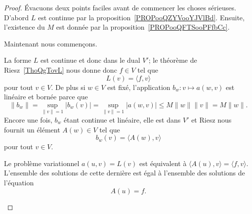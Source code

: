 \begin{proof}
	Évacuons deux points faciles avant de commencer les choses sérieuses. D'abord \( L\) est continue par la proposition~\ref{PROPooQZYVooYJVlBd}. Ensuite, l'existence du \( M\) est donnée par la proposition~\ref{PROPooQFTSooPFfbCc}.

	Maintenant nous commençons.

	\begin{subproof}
		La forme \( L\) est continue et donc dans le dual \( V'\); le théorème de Riesz~\ref{ThoQgTovL} nous donne donc \( f\in V\) tel que
		\begin{equation}
			L(v)=\langle f, v\rangle
		\end{equation}
		pour tout \( v\in V\). De plus si \( w\in V\) est fixé, l'application \( b_w\colon v\mapsto a(w,v)\) est linéaire et bornée parce que
		\begin{equation}
			\| b_w \|=\sup_{\| v \|=1}| b_w(v) |=\sup_{\| v \|=1}| a(w,v) |\leq M\| w \|\| v \|=M\| w \|.
		\end{equation}
		Encore une fois, \( b_w\) étant continue et linéaire, elle est dans \( V'\) et Riesz nous fournit un élément \( A(w)\in V\) tel que
		\begin{equation}
			b_w(v)=\langle A(w), v\rangle
		\end{equation}
		pour tout \( v\in V\).

		Le problème variationnel \( a(u,v)=L(v)\) est équivalent à \( \langle A(u), v\rangle =\langle f, v\rangle \). L'ensemble des solutions de cette dernière est égal à l'ensemble des solutions de l'équation
		\begin{equation}        \label{EQooLPMPooMVuYUX}
			A(u)=f.
		\end{equation}


\end{subproof}
\end{proof}
